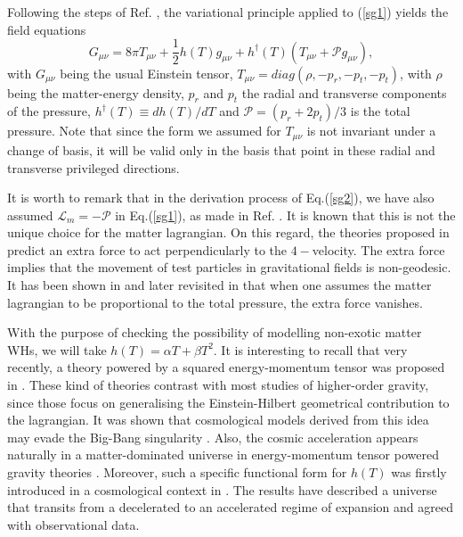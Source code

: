 \documentclass[twocolumn,showpacs,aps,amssymb,floatfix,prd,amsmath,preprintnumbers]{revtex4}
\begin{document}
Following the steps of Ref. \cite{harko/2011}, the variational principle applied to (\ref{sg1}) yields the field equations 
\begin{equation}\label{sg2}
G_{\mu\nu}=8\pi T_{\mu\nu}+\frac{1}{2}h(T)g_{\mu\nu}+h^{\dagger}(T)(T_{\mu\nu}+\mathcal{P}g_{\mu\nu}),
\end{equation}
with $G_{\mu\nu}$ being the usual Einstein tensor, $T_{\mu\nu}=diag(\rho,-p_r,-p_t,-p_t)$, with $\rho$ being the matter-energy density, $p_r$ and $p_t$ the radial and transverse components of the pressure, $h^{\dagger}(T)\equiv dh(T)/dT$ and $\mathcal{P}=(p_r+2p_t)/3$ is the total pressure. Note that since the form we assumed for $T_{\mu\nu}$ is not invariant under a change of basis, it will be valid only in the basis that point in these radial and transverse privileged directions.

It is worth to remark that in the derivation process of Eq.(\ref{sg2}), we have also assumed $\mathcal{L}_m=-\mathcal{P}$ in Eq.(\ref{sg1}), as made in Ref. \cite{harko/2011}. It is known that this is not the unique choice for the matter lagrangian. On this regard, the theories proposed in \cite{harko/2010,harko/2011} predict an extra force to act perpendicularly to the $4-$velocity. The extra force implies that the movement of test particles in gravitational fields is non-geodesic. It has been shown in \cite{bertolami/2008} and later revisited in \cite{harko/2014} that when one assumes the matter lagrangian to be proportional to the total pressure, the extra force vanishes.

With the purpose of checking the possibility of modelling non-exotic matter WHs, we will take $h(T)=\alpha T+\beta T^{2}$.  It is interesting to recall that very recently, a theory powered by a squared energy-momentum tensor was proposed in \cite{roshan/2016}. These kind of theories contrast with most studies of higher-order gravity, since those focus on generalising the Einstein-Hilbert geometrical contribution to the lagrangian. It was shown that cosmological models derived from this idea may evade the Big-Bang singularity \cite{board/2017}. Also, the cosmic acceleration appears naturally in a matter-dominated universe in energy-momentum tensor powered gravity theories \cite{akarsu/2017}. Moreover, such a specific functional form for $h(T)$ was firstly introduced in a cosmological context in \cite{mrc/2016}. The results have described a universe that transits from a decelerated to an accelerated regime of expansion and agreed with observational data.
\end{document}

